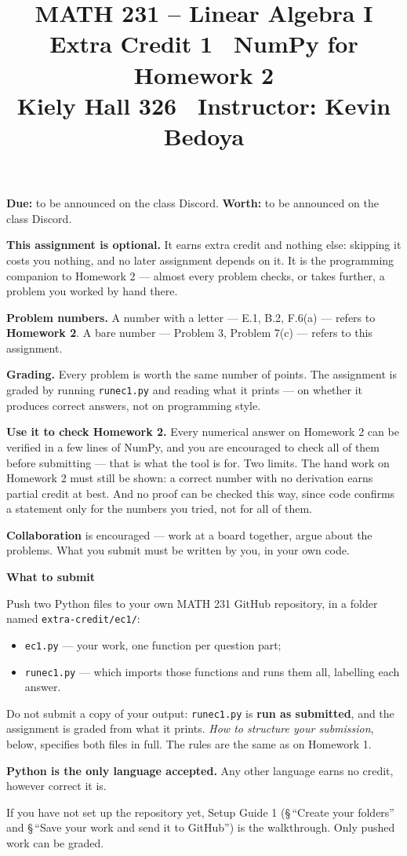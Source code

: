 \documentclass[11pt]{article}
\title{\vspace{-1.2cm}\textbf{\sffamily MATH 231 -- Linear Algebra I}\\[4pt]
       {\large\sffamily Extra Credit 1 \textbullet\ NumPy for Homework 2}\\[2pt]
       {\normalsize\sffamily Kiely Hall 326 \textbullet\
        Instructor: Kevin Bedoya}}
\author{}
\date{}
\newcounter{prob}
\newenvironment{callout}[1]
  {\par\medskip\needspace{5\baselineskip}%
   \begin{lrbox}{\qcbox}%
   \begin{minipage}{\dimexpr\textwidth-2\fboxsep-4pt}%
   \setlength{\parskip}{0.4em}%
   \textbf{\sffamily\color{RoyalBlue}#1}\par}
  {\end{minipage}\end{lrbox}%
   \begin{center}\colorbox{softbg}{\usebox{\qcbox}}\end{center}\medskip}
\newcommand{\duedate}{to be announced on the class Discord}
\newcommand{\ecworth}{to be announced on the class Discord}
\begin{document}
\maketitle
\vspace{-1.6cm}

\noindent\textbf{Due:} \duedate. \quad \textbf{Worth:} \ecworth.

\medskip
\noindent\textbf{This assignment is optional.} It earns extra credit and nothing
else: skipping it costs you nothing, and no later assignment depends on it. It
is the programming companion to Homework 2 --- almost every problem checks, or
takes further, a problem you worked by hand there.

\medskip
\noindent\textbf{Problem numbers.} A number with a letter --- E.1, B.2, F.6(a)
--- refers to \textbf{Homework 2}. A bare number --- Problem 3, Problem 7(c) ---
refers to this assignment.

\medskip
\noindent\textbf{Grading.} Every problem is worth the same number of points. The
assignment is graded by running \texttt{runec1.py} and reading what it prints ---
on whether it produces correct answers, not on programming style.

\medskip
\noindent\textbf{Use it to check Homework 2.} Every numerical answer on Homework 2
can be verified in a few lines of NumPy, and you are encouraged to check all of
them before submitting --- that is what the tool is for. Two limits. The hand
work on Homework 2 must still be shown: a correct number with no derivation earns
partial credit at best. And no proof can be checked this way, since code confirms
a statement only for the numbers you tried, not for all of them.

\medskip
\noindent\textbf{Collaboration} is encouraged --- work at a board together, argue
about the problems. What you submit must be written by you, in your own code.

\begin{callout}{What to submit}
Push two Python files to your own MATH 231 GitHub repository, in a folder named
\texttt{extra-credit/ec1/}:
\begin{itemize}[leftmargin=1.4em,itemsep=5pt,topsep=3pt]
  \item \texttt{ec1.py} --- your work, one function per question part;
  \item \texttt{runec1.py} --- which imports those functions and runs them all,
        labelling each answer.
\end{itemize}
Do not submit a copy of your output: \texttt{runec1.py} is \textbf{run as
submitted}, and the assignment is graded from what it prints. \emph{How to
structure your submission}, below, specifies both files in full. The rules are
the same as on Homework 1.

\textbf{Python is the only language accepted.} Any other language earns no
credit, however correct it is.

If you have not set up the repository yet, Setup Guide 1 (\S\,``Create your
folders'' and \S\,``Save your work and send it to GitHub'') is the walkthrough.
Only pushed work can be graded.
\end{callout}
\end{document}
